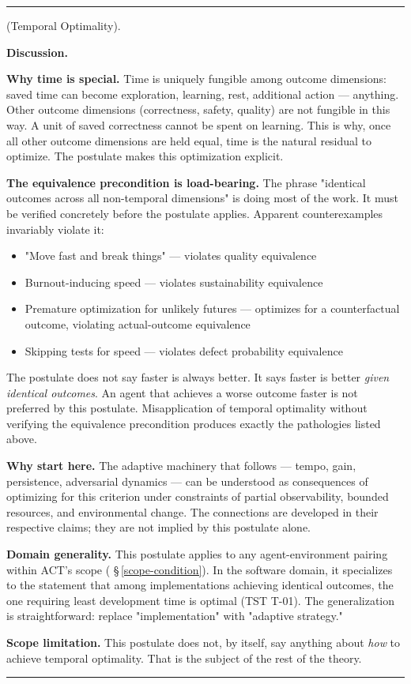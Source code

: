 \documentclass[11pt,oneside]{article}
\newcounter{claim}[section]
\renewcommand{\theclaim}{\thesection.\arabic{claim}}
\newenvironment{segment}[2]{%
  \refstepcounter{claim}%
  \bigskip\noindent\hrule\smallskip
  \noindent{\bfseries #1~\theclaim}\enskip(#2).\par\smallskip
  \noindent\ignorespaces
}{%
  \par\smallskip\noindent\hrule\bigskip
}
\newenvironment{postulate}[1][]{\begin{segment}{Postulate}{#1}}{\end{segment}}
\begin{document}
\begin{postulate}[Temporal Optimality]
\medskip\noindent\textbf{Discussion.}


\textbf{Why time is special.} Time is uniquely fungible among outcome dimensions: saved time can become exploration, learning, rest, additional action — anything. Other outcome dimensions (correctness, safety, quality) are not fungible in this way. A unit of saved correctness cannot be spent on learning. This is why, once all other outcome dimensions are held equal, time is the natural residual to optimize. The postulate makes this optimization explicit.

\textbf{The equivalence precondition is load-bearing.} The phrase "identical outcomes across all non-temporal dimensions" is doing most of the work. It must be verified concretely before the postulate applies. Apparent counterexamples invariably violate it:
\begin{itemize}
  \item "Move fast and break things" — violates quality equivalence
  \item Burnout-inducing speed — violates sustainability equivalence
  \item Premature optimization for unlikely futures — optimizes for a counterfactual outcome, violating actual-outcome equivalence
  \item Skipping tests for speed — violates defect probability equivalence
\end{itemize}


The postulate does not say faster is always better. It says faster is better \textit{given identical outcomes}. An agent that achieves a worse outcome faster is not preferred by this postulate. Misapplication of temporal optimality without verifying the equivalence precondition produces exactly the pathologies listed above.

\textbf{Why start here.} The adaptive machinery that follows — tempo, gain, persistence, adversarial dynamics — can be understood as consequences of optimizing for this criterion under constraints of partial observability, bounded resources, and environmental change. The connections are developed in their respective claims; they are not implied by this postulate alone.

\textbf{Domain generality.} This postulate applies to any agent-environment pairing within ACT's scope ( \S\,\ref{scope-condition}). In the software domain, it specializes to the statement that among implementations achieving identical outcomes, the one requiring least development time is optimal (TST T-01). The generalization is straightforward: replace "implementation" with "adaptive strategy."

\textbf{Scope limitation.} This postulate does not, by itself, say anything about \textit{how} to achieve temporal optimality. That is the subject of the rest of the theory.

\end{postulate}
\end{document}
